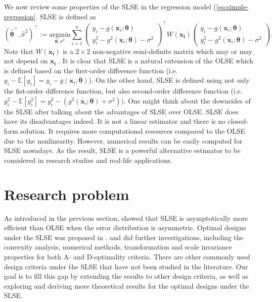 \documentclass[
]{book}
\theoremstyle{definition}
\theoremstyle{definition}
\theoremstyle{definition}
\theoremstyle{definition}
\theoremstyle{remark}
\begin{document}
We now review some properties of the SLSE in the regression model (\eqref{eq:simple-regression}. SLSE is defined as
\begin{equation*}
(\boldsymbol{\hat{\theta}}^\top,\hat{\sigma}^2)^\top:=\underset{\boldsymbol{\theta},\sigma^2}{\mathrm{argmin}}\sum_{i=1}^n 
\begin{pmatrix}
y_i-g(\boldsymbol{x}_i;\boldsymbol{\theta})\\
y_i^2-g^2(\boldsymbol{x}_i;\boldsymbol{\theta})-\sigma^2
\end{pmatrix}^\top
W(\boldsymbol{x_i}) 
\begin{pmatrix}
y_i-g(\boldsymbol{x}_i;\boldsymbol{\theta})\\
y_i^2-g^2(\boldsymbol{x}_i;\boldsymbol{\theta})-\sigma^2
\end{pmatrix}.
\end{equation*}
Note that \(W(\boldsymbol{x_i})\) is a \(2\times 2\) non-negative semi-definite matrix which may or may not depend on \(\boldsymbol{x_i}\) \citep{wang2008second}. It is clear that SLSE is a natural extension of the OLSE which is defined based on the first-order difference function (i.e.~\(y_i-\mathbb{E}[y_i]=y_i-g(\boldsymbol{x}_i;\boldsymbol{\theta})\)). On the other hand, SLSE is defined using not only the fist-order difference function, but also second-order difference function (i.e.~\(y_i^2-\mathbb{E}[y_i^2]=y_i^2-(g^2(\boldsymbol{x}_i;\boldsymbol{\theta})+\sigma^2))\). One might think about the downsides of the SLSE after talking about the advantages of SLSE over OLSE. SLSE does have its disadvantages indeed. It is not a linear estimator and there is no closed-form solution. It requires more computational resources compared to the OLSE due to the nonlinearity. However, numerical results can be easily computed for SLSE nowadays. As the result, SLSE is a powerful alternative estimator to be considered in research studies and real-life applications.

\hypertarget{research-problem}{%
\section{Research problem}\label{research-problem}}

As introduced in the previous section, \citet{wang2008second} showed that SLSE is asymptotically more efficient than OLSE when the error distribution is asymmetric. Optimal designs under the SLSE was proposed in \citet{gao2014new}. \citet{bose2015optimal} \citet{yin2018optimal} and \citet{gao2017d} did further investigations, including the convexity analysis, numerical methods, transformation and scale invariance properties for both A- and D-optimality criteria. There are other commonly used design criteria under the SLSE that have not been studied in the literature. Our goal is to fill this gap by extending the results to other design criteria, as well as exploring and deriving more theoretical results for the optimal designs under the SLSE.
\end{document}
